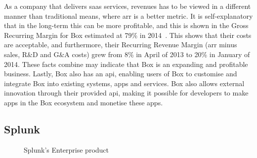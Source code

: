 As a company that delivers \gls{saas} services, revenues has to be viewed in a different manner than traditional means, where \gls{arr} is a better metric. It is self-explanatory that in the long-term this can be more profitable, and this is shown in the Gross Recurring Margin for Box estimated at 79\% in 2014~\cite{tientzuozuora2014}. This shows that their costs are acceptable, and furthermore, their Recurring Revenue Margin (\gls{arr} minus sales, R\&D and G\&A costs) grew from 8\% in April of 2013 to 20\% in January of 2014. These facts combine may indicate that Box is an expanding and profitable business. Lastly, Box also has an \gls{api}, enabling users of Box to customise and integrate Box into existing systems, apps and services. Box also allows external innovation through their provided \gls{api}, making it possible for developers to make apps in the Box ecosystem and monetise these apps. 

\subsection{Splunk}
\begin{figure}[h]
    \centering
    \caption{Splunk's Enterprise product~\cite{splunkinc20162}}
    \label{fig:splunk}
\end{figure}
